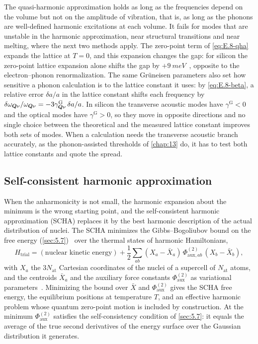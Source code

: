 The quasi-harmonic approximation holds as long as the frequencies depend on the volume but not on the amplitude of vibration, that is, as long as the phonons are well-defined harmonic excitations at each volume. It fails for modes that are unstable in the harmonic approximation, near structural transitions and near melting, where the next two methods apply. The zero-point term of \cref{eq:E.8-qha} expands the lattice at $T = 0$, and this expansion changes the gap: for silicon the zero-point lattice expansion alone shifts the gap by $+\SI{9}{meV}$~\cite[Table~S2]{miglio2020predominance}, opposite to the electron--phonon renormalization. The same Grüneisen parameters also set how sensitive a phonon calculation is to the lattice constant it uses: by \cref{eq:E.8-beta}, a relative error $\delta a/a$ in the lattice constant shifts each frequency by $\delta\omega_{\bm{Q}\nu}/\omega_{\bm{Q}\nu} = -3\gamma^{\mathrm{G}}_{\bm{Q}\nu}\,\delta a/a$. In silicon the transverse acoustic modes have $\gamma^{\mathrm{G}} < 0$ and the optical modes have $\gamma^{\mathrm{G}} > 0$, so they move in opposite directions and no single choice between the theoretical and the measured lattice constant improves both sets of modes. When a calculation needs the transverse acoustic branch accurately, as the phonon-assisted thresholds of \cref{chap:13} do, it has to test both lattice constants and quote the spread.

\subsection{Self-consistent harmonic approximation}

When the anharmonicity is not small, the harmonic expansion about the minimum is the wrong starting point, and the self-consistent harmonic approximation (SCHA) replaces it by the best harmonic description of the actual distribution of nuclei. The SCHA minimizes the Gibbs--Bogoliubov bound on the free energy (\cref{sec:5.7})~\cite[Eq.~(2)]{monacelli2021stochastic} over the thermal states of harmonic Hamiltonians,
\begin{equation}
  H_{\mathrm{trial}} = (\text{nuclear kinetic energy}) + \frac12\sum_{ab}(X_a - \bar X_a)\,\Phi^{(2)}_{\mathrm{aux},ab}\,(X_b - \bar X_b) ,
  \label{eq:E.8-scha}
\end{equation}
with $X_a$ the $3N_{\mathrm{at}}$ Cartesian coordinates of the nuclei of a supercell of $N_{\mathrm{at}}$ atoms, and the centroids $\bar X_a$ and the auxiliary force constants $\Phi^{(2)}_{\mathrm{aux}}$ as variational parameters~\cite[Eqs.~(4) and~(7)]{monacelli2021stochastic}. Minimizing the bound over $\bar X$ and $\Phi^{(2)}_{\mathrm{aux}}$ gives the SCHA free energy, the equilibrium positions at temperature $T$, and an effective harmonic problem whose quantum zero-point motion is included by construction. At the minimum $\Phi^{(2)}_{\mathrm{aux}}$ satisfies the self-consistency condition of \cref{sec:5.7}: it equals the average of the true second derivatives of the energy surface over the Gaussian distribution it generates.

